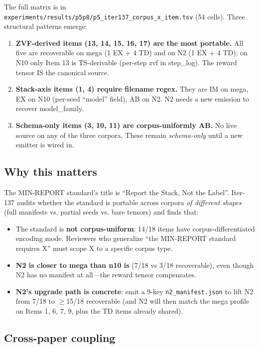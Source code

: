 The full matrix is in
\texttt{experiments/results/p5p8/p5\_iter137\_corpus\_x\_item.tsv} (54 cells).
Three structural patterns emerge:

\begin{enumerate}
  \item \textbf{ZVF-derived items (13, 14, 15, 16, 17) are the most
    portable.} All five are recoverable on mega (1 EX + 4 TD) and on N2
    (1 EX + 4 TD); on N10 only Item 13 is TS-derivable (per-step zvf in
    step\_log). The reward tensor IS the canonical source.
  \item \textbf{Stack-axis items (1, 4) require filename regex.} They are
    IM on mega, EX on N10 (per-seed ``model'' field), AB on N2. N2 needs a
    new emission to recover model\_family.
  \item \textbf{Schema-only items (3, 10, 11) are corpus-uniformly AB.}
    No live source on any of the three corpora. These remain
    \emph{schema-only} until a new emitter is wired in.
\end{enumerate}

\subsection*{Why this matters}

The MIN-REPORT standard's title is ``Report the Stack, Not the Label''.
Iter-137 audits whether the standard is portable across corpora \emph{of
different shapes} (full manifests vs. partial seeds vs. bare tensors) and
finds that:

\begin{itemize}
  \item The standard is \textbf{not corpus-uniform}: 14/18 items have
    corpus-differentiated encoding mode. Reviewers who generalize ``the
    MIN-REPORT standard requires X'' must scope X to a specific corpus
    type.
  \item \textbf{N2 is closer to mega than n10 is} (7/18 vs 3/18 recoverable),
    even though N2 has no manifest at all---the reward tensor compensates.
  \item \textbf{N2's upgrade path is concrete}: emit a 9-key
    \texttt{n2\_manifest.json} to lift N2 from 7/18 to $\geq$15/18
    recoverable (and N2 will then match the mega profile on Items 1, 6, 7,
    9, plus the TD items already shared).
\end{itemize}

\subsection*{Cross-paper coupling}

